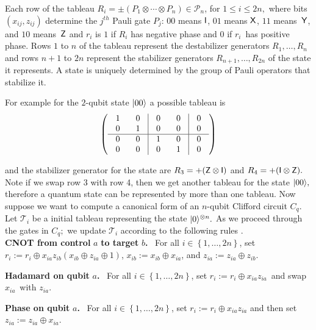 Each row  of the tableau $R_{i}=\pm (P_{1}\otimes \cdots \otimes P_{n})\in \mathcal{P}_n$, for $1\leq i\leq 2n,$ where bits $(x_{ij},z_{ij})$ determine the $j^{th}$ Pauli gate $P_{j}$: $00$
means ${\sf I}$, $01$ means ${\sf X}$, $11$ means~${\sf Y}$, and $10$ means~${\sf Z}$ and $r_{i}$ is $1$ if $R_{i}$ has negative phase and $0$ if $r_{i}$\ has
positive phase. Rows $1$ to $n$ of the tableau represent the destabilizer generators $R_{1},\ldots,R_{n}$ and rows $n+1$ to $2n$ represent the stabilizer
generators $R_{n+1},\ldots,R_{2n}$ of the state it represents. A state is uniquely determined by the group of Pauli operators that stabilize it.

For example for the $2$-qubit state ${\lvert}00\rangle$ a possible tableau is
\[
\left(
\begin{tabular}
[c]{cc|cc|c}%
$~1~$ & $~0~$ & $~0~$ & $~0~$ & $~0~$\\
$~0~$ & $~1~$ & $~0~$ & $~0~$ & $~0~$\\\hline
$~0~$ & $~0~$ & $~1~$ & $~0~$ & $~0~$\\
$~0~$ & $~0~$ & $~0~$ & $~1~$ & $~0~$%
\end{tabular}
\right)
\]

and the stabilizer generator for the state are $R_3=+({\sf Z} \otimes {\sf I})$ and $R_4=+({\sf I}\otimes {\sf Z}).$ Note if we swap row 3 with row 4, then we get another tableau for the state ${\lvert}00\rangle,$ therefore a quantum state can be represented by more than one tableau. Now suppose we want to compute a canonical form of an $n$-qubit Clifford circuit $C_q.$ Let $\mathcal{T}_i$ be a initial tableau representing the state ${\lvert}0\rangle^{\otimes n}.$ As we proceed through the gates in $C_q;$ we update $\mathcal{T}_i$  according to the following rules \cite{AG04}.\\


\noindent\textbf{CNOT from control }$a$\textbf{ to target }$b$\textbf{.} \ For
all $i\in\left\{  1,\ldots,2n\right\}  $, set $r_{i}:=r_{i}\oplus x_{ia}%
z_{ib}\left(  x_{ib}\oplus z_{ia}\oplus1\right)  $, $x_{ib}:=x_{ib}\oplus
x_{ia}$, and $z_{ia}:=z_{ia}\oplus z_{ib}$.\medskip

\noindent\textbf{Hadamard on qubit }$a$\textbf{.} \ For all $i\in\left\{
1,\ldots,2n\right\}  $, set $r_{i}:=r_{i}\oplus x_{ia}z_{ia}$\ and swap
$x_{ia}$\ with $z_{ia}$.\medskip

\noindent\textbf{Phase on qubit }$a$\textbf{.} \ For all $i\in\left\{
1,\ldots,2n\right\}  $, set $r_{i}:=r_{i}\oplus x_{ia}z_{ia}$ and then set
$z_{ia}:=z_{ia}\oplus x_{ia}$.\medskip



